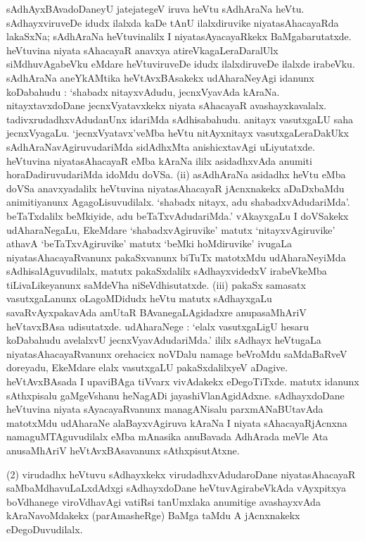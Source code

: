sAdhAyxBAvadoDaneyU jatejategeV iruva heVtu sAdhAraNa heVtu. sAdhayxviruveDe idudx ilalxda kaDe tAnU ilalxdiruvike niyatasAhacayaRda lakaSxNa; sAdhAraNa heVtuvinalilx I niyatasAyacayaRkekx BaMgabarutatxde. heVtuvina niyata sAhacayaR anavxya atireVka\-gaLeraDaralUlx siMdhuvAgabeVku eMdare heVtuviruveDe idudx ilalxdiruveDe ilalxde irabeVku. sAdhA\-raNa aneYkAMtika heVtAvxBAsakekx udAharaNeyAgi idanunx koDabahudu : `shabadx nitayxvAdudu, jecnxVyavAda kAraNa. nitayxtavxdoDane jecnxVyatavxkekx niyata sAhacayaR avashayxka\-valalx. tadivxrudadhxvAdudanUnx idariMda sAdhisabahudu. anitayx vasutxgaLU saha jecnxVya\-gaLu. `jecnxVyatavx'veMba heVtu nitAyxnitayx vasutxgaLeraDakUkx sAdhAraNavAgiruvudariMda sidAdhxMta anishicxtavAgi uLiyutatxde. heVtuvina niyatasAhacayaR eMba kAraNa ililx asidadhxvAda anumiti horaDadiruvudariMda idoMdu doVSa. {\rm(ii)} asAdhAraNa asidadhx heVtu eMba doVSa anavxyadalilx heVtuvina niyatasAhacayaR jAcnxnakekx aDaDxbaMdu animitiyanunx AgagoLisuvudilalx. `shabadx nitayx, adu shabadxvAdudariMda'. beTaTxdalilx beMkiyide, adu beTaTxvAdudariMda.' vAkayxgaLu I doVSakekx udAharaNegaLu, EkeMdare `shabadxvAgiruvike' matutx `nitayxvAgiruvike' athavA `beTaTxvAgiruvike' matutx `beMki hoMdiruvike' ivugaLa niyatasAhacayaRvanunx pakaSxvanunx biTuTx matotxMdu udAharaNeyiMda sAdhisalAguvudilalx, matutx pakaSxdalilx sAdhayxvidedxV irabeVkeMba tiLivaLikeyanunx saMdeVha niSeVdhisutatxde. {\rm(iii)} pakaSx samasatx vasutxgaLanunx oLagoMDidudx heVtu matutx sAdhayxgaLu savaRvAyxpakavAda amUtaR BAvanegaLAgidadxre anupasaMhAriV heVtavxBAsa udisutatxde. udAharaNege : `elalx vasutxgaLigU hesaru koDabahudu avelalxvU jecnxVyavAdudariMda.' ililx sAdhayx heVtugaLa niyatasAhacayaRvanunx orehacicx noVDalu namage beVroMdu saMdaBaRveV doreyadu, EkeMdare elalx vasutxgaLU pakaSxdalilxyeV aDagive. heVtAvxBAsada I upaviBAga tiVvarx vivAdakekx eDegoTiTxde. matutx idanunx sAthxpisalu gaMgeVshanu heNagADi jayashiVlanAgidAdxne. sAdhayxdoDane heVtuvina niyata sAyacayaRvanunx managANisalu parxmANaBUtavAda matotxMdu udAharaNe alaBayxvAgiruva kAraNa I niyata sAhacayaRjAcnxna namaguMTAguvudilalx eMba mAnasika anuBavada AdhArada meVle Ata anusaMhAriV heVtAvxBAsavanunx sAthxpisutAtxne.

(2) virudadhx heVtuvu sAdhayxkekx virudadhxvAdudaroDane niyatasAhacayaR saMbaMdha\-vuLaLxdAdxgi sAdhayxdoDane heVtuvAgirabeVkAda vAyxpitxya boVdhanege viroVdhavAgi vatiRsi tanUmxlaka anumitige avashayxvAda kAraNavoMdakekx (parAmasheRge) BaMga taMdu A jAcnxnakekx eDegoDuvudilalx.

